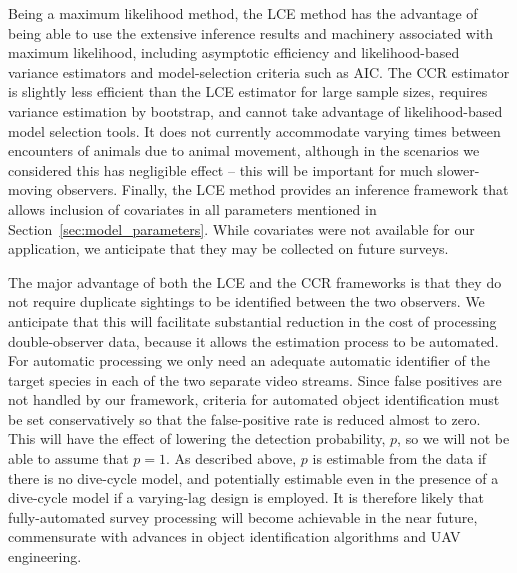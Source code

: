 \documentclass[useAMS, usenatbib, referee]{biom}\usepackage[]{graphicx}\usepackage[]{color}
\begin{document}
Being a maximum likelihood method, the LCE method has the advantage of being able to use the extensive inference results and machinery associated with maximum likelihood, including asymptotic efficiency and likelihood-based variance estimators and model-selection criteria such as AIC. The CCR estimator is slightly less efficient than the LCE estimator for large sample sizes, requires variance estimation by bootstrap, and cannot take advantage of likelihood-based model selection tools. It does not currently accommodate varying times between encounters of animals due to animal movement, although in the scenarios we considered this has negligible effect -- this will be important for much slower-moving observers. Finally, the LCE method provides an inference framework that allows inclusion of covariates in all parameters mentioned in Section~\ref{sec:model_parameters}. While covariates were not available for our application, we anticipate that they may be collected on future surveys. %


The major advantage of both the LCE and the CCR frameworks is that they do not require duplicate sightings to be identified between the two observers. We anticipate that this will facilitate substantial reduction in the cost of processing double-observer data, because it allows the estimation process to be automated. For automatic processing we only need an adequate automatic identifier of the target species in each of the two separate video streams. Since false positives are not handled by our framework, criteria for automated object identification must be set conservatively so that the false-positive rate is reduced almost to zero. This will have the effect of lowering the detection probability, $p$, so we will not be able to assume that $p=1$. As described above, $p$ is estimable from the data if there is no dive-cycle model, and potentially estimable even in the presence of a dive-cycle model if a varying-lag design is employed. It is therefore likely that fully-automated survey processing will become achievable in the near future, commensurate with advances in object identification algorithms and UAV engineering.
\end{document}
